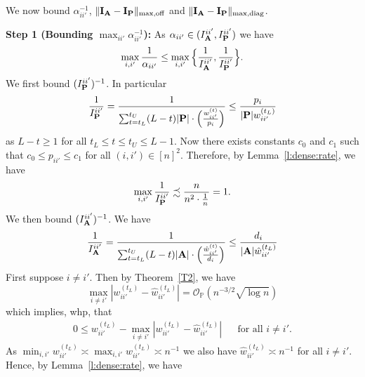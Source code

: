 \documentclass[10pt,journal,compsoc]{IEEEtran}
\newcommand{\op}{\mathcal{O}_{\mathbb{P}}}
\newcommand{\ee}{\end{aligned} \end{equation}}
\newcommand{\bee}{\begin{equation}\begin{aligned}}
\newcommand{\M}[1]{{{\mathbf{\MakeUppercase{#1}}}}}
\numberwithin{equation}{section}
\begin{document}
We now bound $\alpha_{ii'}^{-1}$, $\|\M I_{\M A} - \M I_{\M
  P}\|_{\max,\text{off}}$ and $\|\M I_{\M A} - \M I_{\M
  P}\|_{\max,\text{diag}}$.

\noindent\textbf{Step 1 (Bounding $\max_{ii'} \alpha_{ii'}^{-1}$):} 
As $\alpha_{ii'} \in (I_{\M A}^{ii'}, I_{\M P}^{ii'})$ we have
\bee\label{T3:S11}
\max_{i,i'}\frac{1}{\alpha_{ii'}}\leq \max_{i,i'}\Big\{\frac{1}{I^{ii'}_{\M A}},\frac{1}{I^{ii'}_{\M P}}\Big\}.
\ee
We first bound $(I_{\M P}^{ii'})^{-1}$. In particular
\bee\nonumber
\frac{1}{I_{\M P}^{ii'}} = \frac{1}{\sum_{t = t_L}^{t_U}(L -
  t)|\M P|\cdot\Big(\frac{{w}_{ii'}^{(t)}}{p_i}\Big)}\leq
\frac{p_i}{|\M P|w^{(t_L)}_{ii'}}
\ee
as $L - t \geq 1$ for all $t_L \leq t \leq t_U \leq L - 1$. 
Now there exists constants $c_0$ and $c_1$ such that $c_0\leq p_{ii'}\leq c_1$ for all $(i,i')\in[n]^2$. Therefore, by Lemma~\ref{l:dense:rate}, we have 
\bee\label{T3:S12}
\max_{i,i'}\frac{1}{I^{ii'}_{\M P}} \precsim \frac{n}{n^2\cdot \frac{1}{n}} = 1.
\ee
We then bound $(I^{ii'}_{\M A})^{-1}$. We have
\bee\nonumber
\frac{1}{I^{ii'}_{\M A}} = \frac{1}{\sum_{t = t_L}^{t_U}(L -
  t)|\M A|\cdot\Big(\frac{\hat{w}_{ii'}^{(t)}}{d_i}\Big)} \leq
\frac{d_i}{|\M A| \hat{w}_{ii'}^{(t_L)}}
\ee
First suppose $i \not = i'$. Then by Theorem~\ref{T2}, we have
$$\max_{i \neq {i'}}|w^{(t_L)}_{ii'} - \hat{w}^{(t_L)}_{ii'}| =
\op(n^{-3/2} \sqrt{\log n})$$
which implies, whp, that
\bee\label{pf:d:ii'}
0\leq {w^{(t_L)}_{ii'} - \max_{i \neq {i'}}|w^{(t_L)}_{ii'} - \hat{w}^{(t_L)}_{ii'}|} & & \text{for all } %
i \neq {i'}.
\ee
 As $\min_{i,i'}w^{(t_L)}_{ii'} \asymp \max_{i,i'}w^{(t_L)}_{ii'}\asymp n^{-1}$ we also have
 $\hat{w}_{ii'}^{(t_L)} \asymp n^{-1}$ for all $i \not = i'$. 
 Hence, by Lemma~\ref{l:dense:rate}, we have
\end{document}
